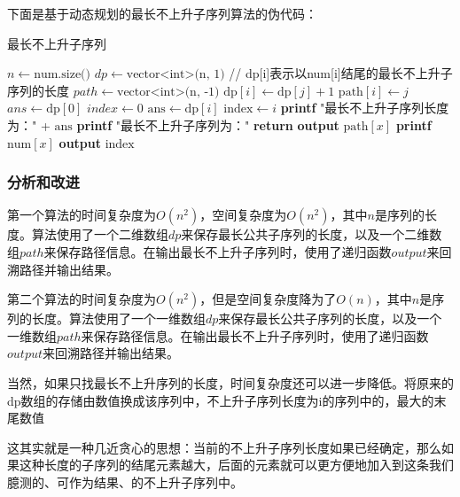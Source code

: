 \documentclass[lang=cn,11pt,a4paper]{elegantpaper}
\begin{document}
下面是基于动态规划的最长不上升子序列算法的伪代码：

\begin{algorithm}[H]
\caption{最长不上升子序列}
\begin{algorithmic}[1]
    \State $n \gets \text{num.size()}$
    \State $dp \gets \text{vector<int>(n, 1)}$ // dp[i]表示以num[i]结尾的最长不上升子序列的长度
    \State $path \gets \text{vector<int>(n, -1)}$
    \State $\text{dp}[i] \gets \text{dp}[j] + 1$
    \State $\text{path}[i] \gets j$
    \EndIf
    \EndFor
    \EndFor
    \State $ans \gets \text{dp}[0]$
    \State $index \gets 0$
    \State $\text{ans} \gets \text{dp}[i]$
    \State $\text{index} \gets i$
    \EndIf
    \EndFor
    \State \textbf{printf} "最长不上升子序列长度为：" + $\text{ans}$
    \State \textbf{printf} "最长不上升子序列为："
     
        \State \textbf{return}
        \EndIf
        \State \textbf{output} $\text{path}[x]$
        \State \textbf{printf} $\text{num}[x]$
    \EndProcedure
    \State \textbf{output} $\text{index}$
\EndProcedure
\end{algorithmic}
\end{algorithm}

\subsubsection{分析和改进}
第一个算法的时间复杂度为$O(n^2)$，空间复杂度为$O(n^2)$，其中$n$是序列的长度。算法使用了一个二维数组$dp$来保存最长公共子序列的长度，以及一个二维数组$path$来保存路径信息。在输出最长不上升子序列时，使用了递归函数$output$来回溯路径并输出结果。

第二个算法的时间复杂度为$O(n^2)$，但是空间复杂度降为了$O(n)$，其中$n$是序列的长度。算法使用了一个一维数组$dp$来保存最长公共子序列的长度，以及一个一维数组$path$来保存路径信息。在输出最长不上升子序列时，使用了递归函数$output$来回溯路径并输出结果。

当然，如果只找最长不上升序列的长度，时间复杂度还可以进一步降低。将原来的dp数组的存储由数值换成该序列中，不上升子序列长度为i的序列中的，最大的末尾数值

这其实就是一种几近贪心的思想：当前的不上升子序列长度如果已经确定，那么如果这种长度的子序列的结尾元素越大，后面的元素就可以更方便地加入到这条我们臆测的、可作为结果、的不上升子序列中。
\end{document}
